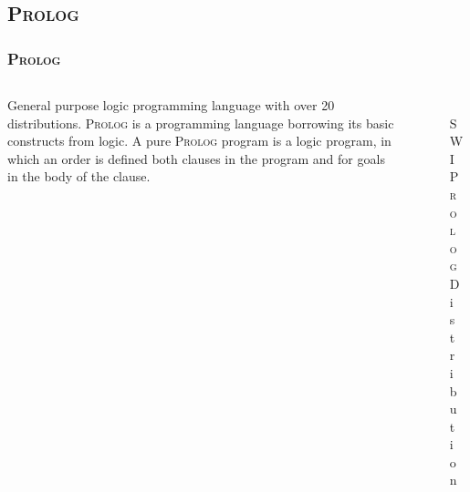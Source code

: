 \documentclass[hideothersubsections, t, aspectratio=1610]{beamer}
\newcommand{\progLang}[1]{\textsc{#1}}
\begin{document}
\subsection{\progLang{Prolog}}
\begin{frame}
\frametitle{\progLang{Prolog}}
  \begin{columns}[T]
    \begin{column}{.6\textwidth}
     \begin{block}{}
General purpose logic programming language with over 20 distributions. \progLang{Prolog} is a programming language borrowing its basic 
constructs from logic. A pure \progLang{Prolog} program is a logic program, in which an order is defined both clauses in the program and 
for goals in the body of the clause.
    \end{block}
    \end{column}
    \begin{column}{.4\textwidth}
    \begin{block}{}
\begin{figure}
    \includegraphics[width=\textwidth]{swipl.png} 
    \caption{\textsc{SWI Prolog} Distribution}
 \end{figure}   
    \end{block}
    \end{column}
  \end{columns}
\end{frame}
\end{document}
